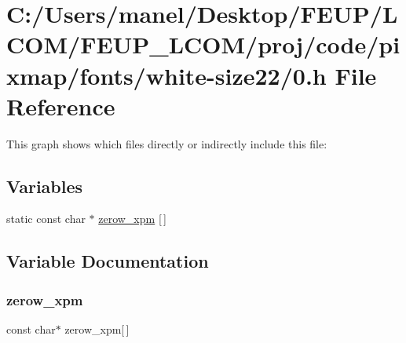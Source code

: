 \hypertarget{white-size22_20_8h}{}\section{C\+:/\+Users/manel/\+Desktop/\+F\+E\+U\+P/\+L\+C\+O\+M/\+F\+E\+U\+P\+\_\+\+L\+C\+O\+M/proj/code/pixmap/fonts/white-\/size22/0.h File Reference}
\label{white-size22_20_8h}
This graph shows which files directly or indirectly include this file\+:
\subsection*{Variables}
\begin{DoxyCompactItemize}
\item 
static const char $\ast$ \mbox{\hyperlink{white-size22_20_8h_afbacdf882cf729bad0cecd3e1497c3aa}{zerow\+\_\+xpm}} \mbox{[}$\,$\mbox{]}
\end{DoxyCompactItemize}


\subsection{Variable Documentation}
\mbox{\label{white-size22_20_8h_afbacdf882cf729bad0cecd3e1497c3aa}} 
\subsubsection{\texorpdfstring{zerow\_xpm}{zerow\_xpm}}
{\footnotesize\ttfamily const char$\ast$ zerow\+\_\+xpm\mbox{[}$\,$\mbox{]}\hspace{0.3cm}{\ttfamily [static]}}

